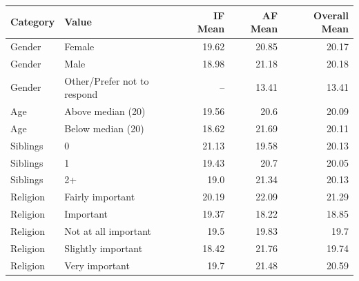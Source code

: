 \begin{tabular}{llrrr}
  \toprule
  Category & Value & IF Mean & AF Mean & Overall Mean \\ 
  \midrule
  Gender & Female & 19.62 & 20.85 & 20.17 \\ 
  Gender & Male & 18.98 & 21.18 & 20.18 \\ 
  Gender & Other/Prefer not to respond & -- & 13.41 & 13.41 \\ 
  Age & Above median (20) & 19.56 & 20.6 & 20.09 \\ 
  Age & Below median (20) & 18.62 & 21.69 & 20.11 \\ 
  Siblings & 0 & 21.13 & 19.58 & 20.13 \\ 
  Siblings & 1 & 19.43 & 20.7 & 20.05 \\ 
  Siblings & 2+ & 19.0 & 21.34 & 20.13 \\ 
  Religion & Fairly important & 20.19 & 22.09 & 21.29 \\ 
  Religion & Important & 19.37 & 18.22 & 18.85 \\ 
  Religion & Not at all important & 19.5 & 19.83 & 19.7 \\ 
  Religion & Slightly important & 18.42 & 21.76 & 19.74 \\ 
  Religion & Very important & 19.7 & 21.48 & 20.59 \\ 
  \bottomrule
\end{tabular}
